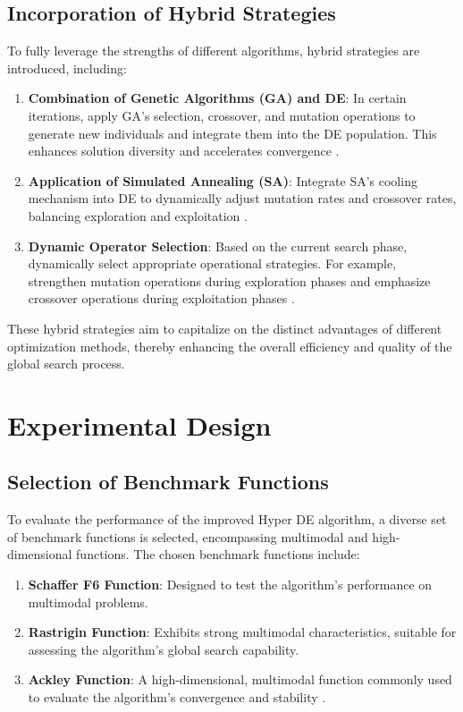 \documentclass[conference]{IEEEtran}
\begin{document}
\subsection{Incorporation of Hybrid Strategies}

To fully leverage the strengths of different algorithms, hybrid strategies are introduced, including:

\begin{enumerate}
    \item \textbf{Combination of Genetic Algorithms (GA) and DE}: In certain iterations, apply GA's selection, crossover, and mutation operations to generate new individuals and integrate them into the DE population. This enhances solution diversity and accelerates convergence \cite{grobler2010alternative}.
    \item \textbf{Application of Simulated Annealing (SA)}: Integrate SA's cooling mechanism into DE to dynamically adjust mutation rates and crossover rates, balancing exploration and exploitation \cite{grobler2010alternative}.
    \item \textbf{Dynamic Operator Selection}: Based on the current search phase, dynamically select appropriate operational strategies. For example, strengthen mutation operations during exploration phases and emphasize crossover operations during exploitation phases \cite{grobler2010alternative}.
\end{enumerate}

These hybrid strategies aim to capitalize on the distinct advantages of different optimization methods, thereby enhancing the overall efficiency and quality of the global search process.

\section{Experimental Design}

\subsection{Selection of Benchmark Functions}

To evaluate the performance of the improved Hyper DE algorithm, a diverse set of benchmark functions is selected, encompassing multimodal and high-dimensional functions. The chosen benchmark functions include:

\begin{enumerate}
    \item \textbf{Schaffer F6 Function}: Designed to test the algorithm's performance on multimodal problems.
    \item \textbf{Rastrigin Function}: Exhibits strong multimodal characteristics, suitable for assessing the algorithm's global search capability.
    \item \textbf{Ackley Function}: A high-dimensional, multimodal function commonly used to evaluate the algorithm's convergence and stability \cite{burke2013hyper, grobler2010alternative}.
\end{enumerate}
\end{document}
